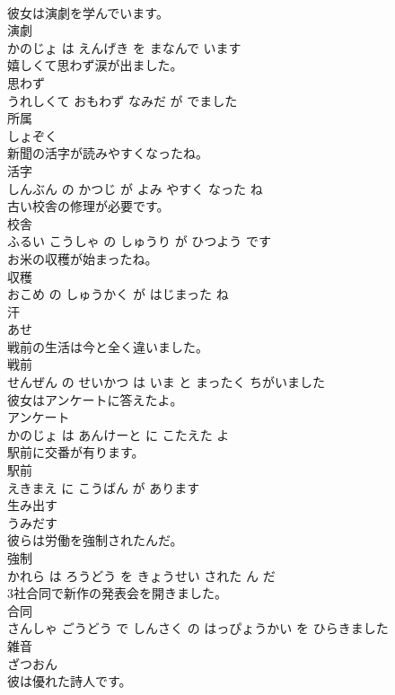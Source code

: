 \documentclass[8pt]{extreport}
\begin{document}
\begin{CJK}{UTF8}{min}
\\	彼女は演劇を学んでいます。	
\\	演劇 
\\	かのじょ は えんげき を まなんで います			
\\	嬉しくて思わず涙が出ました。	
\\	思わず 
\\	うれしくて おもわず なみだ が でました			
\\	所属	
\\	しょぞく			
\\	新聞の活字が読みやすくなったね。	
\\	活字 
\\	しんぶん の かつじ が よみ やすく なった ね			
\\	古い校舎の修理が必要です。	
\\	校舎 
\\	ふるい こうしゃ の しゅうり が ひつよう です			
\\	お米の収穫が始まったね。	
\\	収穫 
\\	おこめ の しゅうかく が はじまった ね			
\\	汗	
\\	あせ			
\\	戦前の生活は今と全く違いました。	
\\	戦前 
\\	せんぜん の せいかつ は いま と まったく ちがいました			
\\	彼女はアンケートに答えたよ。	
\\	アンケート 
\\	かのじょ は あんけーと に こたえた よ			
\\	駅前に交番が有ります。	
\\	駅前 
\\	えきまえ に こうばん が あります			
\\	生み出す	
\\	うみだす			
\\	彼らは労働を強制されたんだ。	
\\	強制 
\\	かれら は ろうどう を きょうせい された ん だ			
\\	3社合同で新作の発表会を開きました。	
\\	合同 
\\	さんしゃ ごうどう で しんさく の はっぴょうかい を ひらきました			
\\	雑音	
\\	ざつおん			
\\	彼は優れた詩人です。	

\end{CJK}
\end{document}

